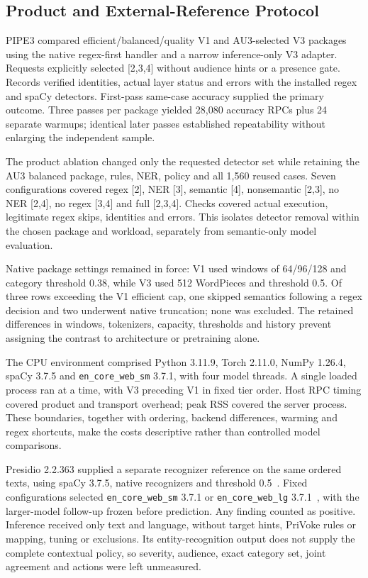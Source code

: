 \documentclass[conference]{IEEEtran}
\begin{document}
\subsection{Product and External-Reference Protocol}
\label{sec:pipeline_comparison_methods}
PIPE3 compared efficient/balanced/quality V1 and AU3-selected V3 packages using the native regex-first handler and a narrow inference-only V3 adapter. Requests explicitly selected [2,3,4] without audience hints or a presence gate. Records verified identities, actual layer status and errors with the installed regex and spaCy detectors. First-pass same-case accuracy supplied the primary outcome. Three passes per package yielded 28,080 accuracy RPCs plus 24 separate warmups; identical later passes established repeatability without enlarging the independent sample.

The product ablation changed only the requested detector set while retaining the AU3 balanced package, rules, NER, policy and all 1,560 reused cases. Seven configurations covered regex [2], NER [3], semantic [4], nonsemantic [2,3], no NER [2,4], no regex [3,4] and full [2,3,4]. Checks covered actual execution, legitimate regex skips, identities and errors. This isolates detector removal within the chosen package and workload, separately from semantic-only model evaluation.

Native package settings remained in force: V1 used windows of 64/96/128 and category threshold 0.38, while V3 used 512 WordPieces and threshold 0.5. Of three rows exceeding the V1 efficient cap, one skipped semantics following a regex decision and two underwent native truncation; none was excluded. The retained differences in windows, tokenizers, capacity, thresholds and history prevent assigning the contrast to architecture or pretraining alone.

The CPU environment comprised Python 3.11.9, Torch 2.11.0, NumPy 1.26.4, spaCy 3.7.5 and \texttt{en\_core\_web\_sm} 3.7.1, with four model threads. A single loaded process ran at a time, with V3 preceding V1 in fixed tier order. Host RPC timing covered product and transport overhead; peak RSS covered the server process. These boundaries, together with ordering, backend differences, warming and regex shortcuts, make the costs descriptive rather than controlled model comparisons.

Presidio 2.2.363 supplied a separate recognizer reference on the same ordered texts, using spaCy 3.7.5, native recognizers and threshold 0.5~\cite{PresidioNlpConfiguration2026}. Fixed configurations selected \texttt{en\_core\_web\_sm} 3.7.1 or \texttt{en\_core\_web\_lg} 3.7.1~\cite{SpacyLarge371Release2026}, with the larger-model follow-up frozen before prediction. Any finding counted as positive. Inference received only text and language, without target hints, PriVoke rules or mapping, tuning or exclusions. Its entity-recognition output does not supply the complete contextual policy, so severity, audience, exact category set, joint agreement and actions were left unmeasured.
\end{document}
